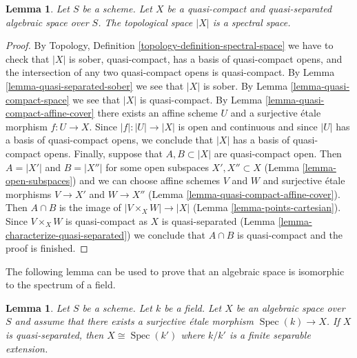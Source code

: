 \documentclass{stacks-project}
\theoremstyle{plain}
\newtheorem{lemma}[subsection]{Lemma}
\theoremstyle{definition}
\theoremstyle{remark}
\numberwithin{equation}{subsection}
\def\Spec{\mathop{\mathrm{Spec}}}
\begin{document}
\begin{lemma}
\label{lemma-quasi-compact-quasi-separated-spectral}
Let $S$ be a scheme. Let $X$ be a quasi-compact and quasi-separated
algebraic space over $S$. The topological space $|X|$ is a spectral space.
\end{lemma}

\begin{proof}
By Topology, Definition \ref{topology-definition-spectral-space}
we have to check that $|X|$ is sober, quasi-compact, has a basis
of quasi-compact opens, and the intersection of any two
quasi-compact opens is quasi-compact. By
Lemma \ref{lemma-quasi-separated-sober} we see that $|X|$ is sober.
By Lemma \ref{lemma-quasi-compact-space} we see that $|X|$ is quasi-compact.
By Lemma \ref{lemma-quasi-compact-affine-cover} there exists an affine scheme
$U$ and a surjective \'etale morphism $f : U \to X$.
Since $|f| : |U| \to |X|$ is open and continuous and since $|U|$ has
a basis of quasi-compact opens, we conclude that $|X|$ has a basis
of quasi-compact opens. Finally, suppose that
$A, B \subset |X|$ are quasi-compact open. Then $A = |X'|$ and $B = |X''|$
for some open subspaces $X', X'' \subset X$ (Lemma \ref{lemma-open-subspaces})
and we can choose affine schemes $V$ and $W$ and surjective
\'etale morphisms $V \to X'$ and $W \to X''$
(Lemma \ref{lemma-quasi-compact-affine-cover}).
Then $A \cap B$ is the image of
$|V \times_X W| \to |X|$ (Lemma \ref{lemma-points-cartesian}).
Since $V \times_X W$ is quasi-compact as $X$ is quasi-separated
(Lemma \ref{lemma-characterize-quasi-separated})
we conclude that $A \cap B$ is quasi-compact and the proof is finished.
\end{proof}

\noindent
The following lemma can be used to prove that
an algebraic space is isomorphic to the spectrum of a field.

\begin{lemma}
\label{lemma-point-like-spaces}
Let $S$ be a scheme. Let $k$ be a field.
Let $X$ be an algebraic space over $S$ and assume that there exists
a surjective \'etale morphism $\Spec(k) \to X$.
If $X$ is quasi-separated, then $X \cong \Spec(k')$
where $k/k'$ is a finite separable extension.
\end{lemma}
\end{document}
